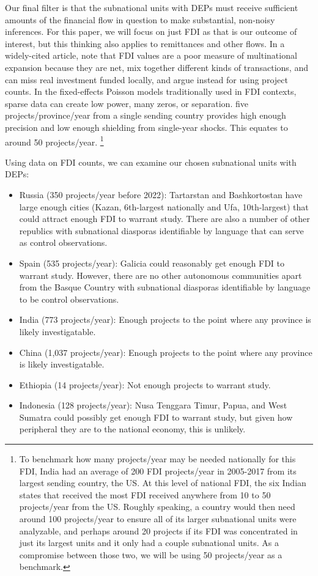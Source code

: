 \documentclass[doublespace,nopageskip]{UVAthesis}
\begin{document}
    Our final filter is that the subnational units with DEPs must receive sufficient amounts of the financial flow in question to make substantial, non-noisy inferences. For this paper, we will focus on just FDI as that is our outcome of interest, but this thinking also applies to remittances and other flows. In a widely-cited article, \citet{desbordes_effects_2017} note that FDI values are a poor measure of multinational expansion because they are net, mix together different kinds of transactions, and can miss real investment funded locally, and argue instead for using project counts. In the fixed-effects Poisson models traditionally used in FDI contexts, sparse data can create low power, many zeros, or separation\citep{santos_silva_further_2011}. five projects/province/year from a single sending country provides high enough precision and low enough shielding from single-year shocks. This equates to around 50 projects/year. \footnote{To benchmark how many projects/year may be needed nationally for this FDI, India had an average of 200 FDI projects/year in 2005-2017 from its largest sending country, the US. At this level of national FDI, the six Indian states that received the most FDI received anywhere from 10 to 50 projects/year from the US. Roughly speaking, a country would then need around 100 projects/year to ensure all of its larger subnational units were analyzable, and perhaps around 20 projects if its FDI was concentrated in just its largest units and it only had a couple subnational units. As a compromise between those two, we will be using 50 projects/year as a benchmark.} 
    
    Using \citet{unctad_world_2025} data on FDI counts, we can examine our chosen subnational units with DEPs:
        \begin{itemize}
        \item Russia (350 projects/year before 2022): Tartarstan and Bashkortostan have large enough cities (Kazan, 6th-largest nationally and Ufa, 10th-largest) that could attract enough FDI to warrant study. There are also a number of other republics with subnational diasporas identifiable by language that can serve as control observations.
        \item Spain (535 projects/year): Galicia could reasonably get enough FDI to warrant study. However, there are no other autonomous communities apart from the Basque Country with subnational diasporas identifiable by language to be control observations.
        \item India (773 projects/year): Enough projects to the point where any province is likely investigatable.
        \item China (1,037 projects/year): Enough projects to the point where any province is likely investigatable.
        \item Ethiopia (14 projects/year): Not enough projects to warrant study.
        \item Indonesia (128 projects/year): Nusa Tenggara Timur, Papua, and West Sumatra could possibly get enough FDI to warrant study, but given how peripheral they are to the national economy, this is unlikely.
    \end{itemize}
    
\end{document}
